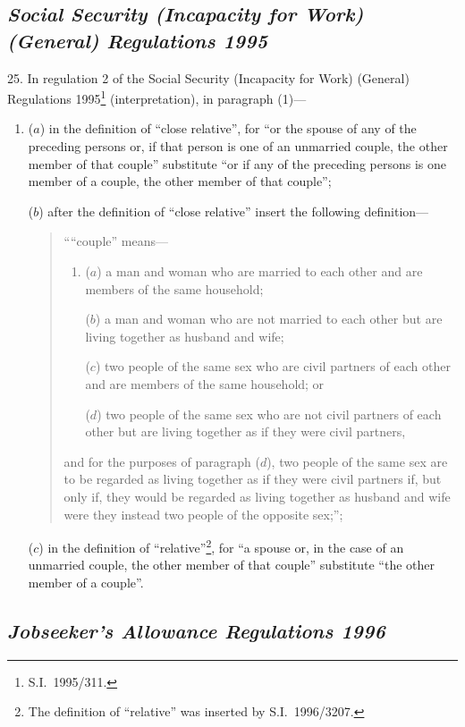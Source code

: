 \documentclass[12pt,a4paper]{article}
\begin{document}
\subsection*{\itshape Social Security (Incapacity for Work) (General) Regulations 1995}

25.  In regulation 2 of the Social Security (Incapacity for Work) (General) Regulations 1995\footnote{S.I.\ 1995/311.} (interpretation), in paragraph (1)—
\begin{enumerate}\item[]
($a$) in the definition of “close relative”, for “or the spouse of any of the preceding persons or, if that person is one of an unmarried couple, the other member of that couple” substitute “or if any of the preceding persons is one member of a couple, the other member of that couple”;

($b$) after the definition of “close relative” insert the following definition—
\begin{quotation}
““couple” means—
\begin{enumerate}\item[]
($a$) 
a man and woman who are married to each other and are members of the same household;

($b$) 
a man and woman who are not married to each other but are living together as husband and wife;

($c$) 
two people of the same sex who are civil partners of each other and are members of the same household; or

($d$) 
two people of the same sex who are not civil partners of each other but are living together as if they were civil partners,
\end{enumerate}
and for the purposes of paragraph ($d$), two people of the same sex are to be regarded as living together as if they were civil partners if, but only if, they would be regarded as living together as husband and wife were they instead two people of the opposite sex;”;
\end{quotation}

($c$) in the definition of “relative”\footnote{The definition of “relative” was inserted by S.I.\ 1996/3207.}, for “a spouse or, in the case of an unmarried couple, the other member of that couple” substitute “the other member of a couple”.
\end{enumerate}

\subsection*{\itshape Jobseeker’s Allowance Regulations 1996}
\end{document}
